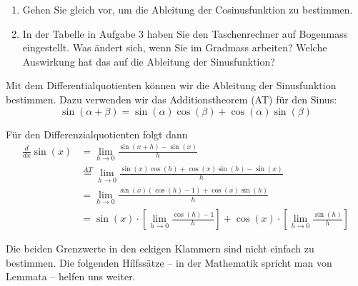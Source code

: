 \begin{LA}
\begin{enumerate}[resume]
		\item Gehen Sie gleich vor, um die Ableitung der Cosinusfunktion zu bestimmen.
		\item In der Tabelle in Aufgabe 3 haben Sie den Taschenrechner auf Bogenmass eingestellt. Was ändert sich, wenn Sie im Gradmass arbeiten? Welche Auswirkung hat das auf die Ableitung der Sinusfunktion?
	\end{enumerate}

\end{LA}
\clearpage

Mit dem Differentialquotienten können wir die Ableitung der Sinusfunktion bestimmen. Dazu verwenden wir das Additionstheorem (AT) für den Sinus:
$$  \sin(\alpha + \beta) = \sin(\alpha) \cos(\beta) +\cos(\alpha) \sin(\beta) $$

Für den Differenzialquotienten folgt dann
\begin{align*}
	\frac{d}{dx} \sin(x) & = \lim_{h\rightarrow0} \frac{\sin(x+h)-\sin(x)}{h}                                                                                     \\
	                     & \stackrel{AT}{=} \lim_{h\rightarrow0} \frac{\sin(x)\cos(h)+\cos(x)\sin(h)-\sin(x)}{h}                                                  \\
	                     & = \lim_{h\rightarrow0} \frac{\sin(x) \left(\cos(h)-1\right)+\cos(x)\sin(h)}{h}                                                         \\
	                     & = \sin(x)\cdot \left[\lim_{h\rightarrow0}\frac{\cos(h)-1}{h}\right] +\cos(x) \cdot \left[\lim_{h\rightarrow0}\frac{\sin(h)}{h} \right]
\end{align*}

Die beiden Grenzwerte in den eckigen Klammern sind nicht einfach zu bestimmen. Die folgenden Hilfssätze – in der Mathematik spricht man von Lemmata – helfen uns weiter.

